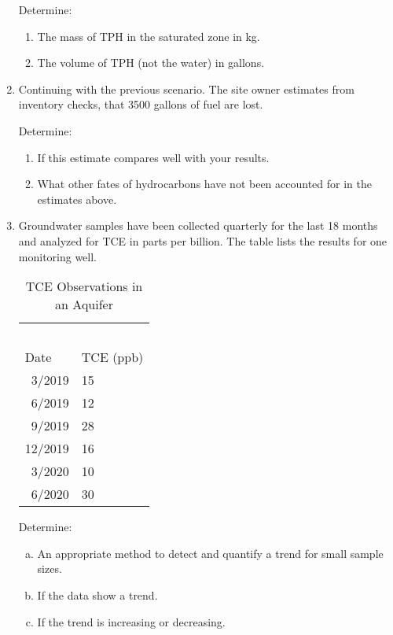 \documentclass[12pt]{article}
\begin{document}
\begin{enumerate}
Determine:
\begin{enumerate}
\item The mass of TPH in the saturated zone in kg.
\item The volume of TPH (not the water) in gallons.
\end{enumerate}

\item Continuing with the previous scenario. The site owner estimates from inventory checks, that 3500 gallons of fuel are lost.  

Determine:
\begin{enumerate}
\item If this estimate compares well with your results.
\item What other fates of hydrocarbons have not been accounted for in the estimates above.
\end{enumerate}

\clearpage %
\item Groundwater samples have been collected quarterly for the last 18 months and analyzed for TCE in parts per billion.  The table lists the results for one monitoring well.

\begin{table}[htbp]
\centering
\caption{TCE Observations in an Aquifer}
\begin{tabular}{p{1.5in}p{1.5in}} %
~&~\\
Date&TCE (ppb)\\
\hline
\hline
~3/2019&15\\
~6/2019&12\\
~9/2019&28\\
12/2019&16\\
~3/2020&10\\
~6/2020&30\\
\hline
\end{tabular}
\label{tab:TCEobserve}
\end{table}

Determine:
\begin{enumerate}[a)]
\item An appropriate method to detect and quantify a trend for small sample sizes.
\item If the data show a trend.
\item If the trend is increasing or decreasing.
\end{enumerate}
\clearpage %

\end{enumerate}
\end{document}

